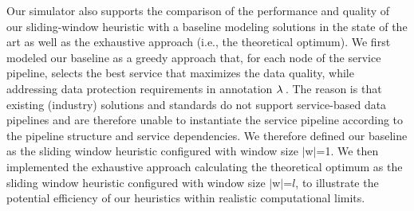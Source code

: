 {\color{OurColor} 
Our simulator also supports the comparison of the performance and quality of our sliding-window heuristic with a baseline modeling solutions in the state of the art as well as the exhaustive approach (i.e., the theoretical optimum). We first modeled our baseline as a greedy approach that, for each node of the service pipeline, selects the best service that maximizes the data quality, while addressing data protection requirements in annotation $\lambda\,$. The reason is that existing (industry) solutions and standards do not support service-based data pipelines and are therefore unable to instantiate the service pipeline according to the pipeline structure and service dependencies. We therefore defined our baseline as the sliding window heuristic configured with window size $|$w$|$=1. %
We then implemented the exhaustive approach calculating the theoretical optimum as the sliding window heuristic configured with window size $|$w$|$=$l$, to illustrate the potential efficiency of our heuristics within realistic computational limits.
}

